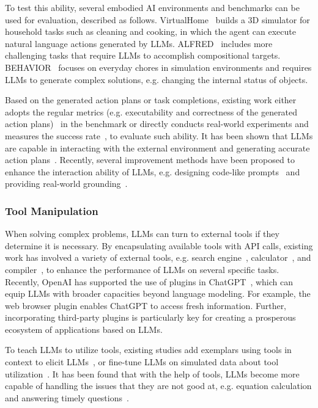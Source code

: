 {{{To test this ability,  several embodied AI environments and benchmarks can be  used for evaluation, described as follows. VirtualHome~\cite{Puig-CVPR-2018-VirtualHome} builds a 3D simulator for household tasks such as cleaning and cooking, in which the agent can execute natural language actions generated by LLMs. ALFRED~\cite{Shridhar-CVPR-2020-ALFRED} includes more challenging tasks that require LLMs to accomplish compositional targets. BEHAVIOR~\cite{Srivastava-CoRL-2021-BEHAVIOR} focuses on  {everyday chores} in simulation environments and requires LLMs to generate complex solutions, e.g. changing the internal status of objects. 

Based on the generated action plans or task completions, existing work either adopts the regular metrics (e.g. executability and correctness of the generated action plans)~\cite{Huang-ICML-2022-Language} in the benchmark or directly conducts real-world experiments and measures the success rate~\cite{Ahn-arxiv-2022-Do}, to evaluate such ability. It has been shown that  LLMs are  capable in interacting with the external environment and generating accurate action plans~\cite{Liang-arxiv-2022-Code}. Recently, several improvement methods have  been proposed to enhance the interaction ability of LLMs, e.g. designing code-like prompts~\cite{Singh-arxiv-2022-ProgPrompt} and providing real-world grounding~\cite{Ahn-arxiv-2022-Do}.  

\subsubsection{Tool Manipulation}

When solving complex problems, LLMs can turn to external tools if they determine it is necessary. By encapsulating available tools with API calls, existing work has involved a variety of  external tools, e.g. search engine~\cite{Nakano-arxiv-2021-WebGPT}, calculator~\cite{Schick-arxiv-2023-Toolformer}, and compiler~\cite{Gao-arxiv-2022-PAL}, to enhance the performance of LLMs on several  specific tasks. Recently, OpenAI has supported the use of  plugins in ChatGPT~\cite{OpenAI-blog-2023-plugins}, which can equip LLMs with broader capacities beyond language modeling. For example, the web browser plugin enables ChatGPT to access fresh information. Further, incorporating third-party plugins is particularly key for creating a prosperous ecosystem of applications based on LLMs. 

To teach LLMs to utilize tools, existing studies add exemplars using tools in context to elicit LLMs~\cite{Gao-arxiv-2022-PAL}, or fine-tune LLMs on simulated data about tool utilization~\cite{Parisi-arxiv-2022-TALM, Schick-arxiv-2023-Toolformer}. It has been found that with the help of tools, LLMs become  more capable of handling the issues that they are not good at,  e.g. equation calculation and answering timely questions~\cite{Schick-arxiv-2023-Toolformer,Chen-2023-arXiv-chatcot}.

}}}
